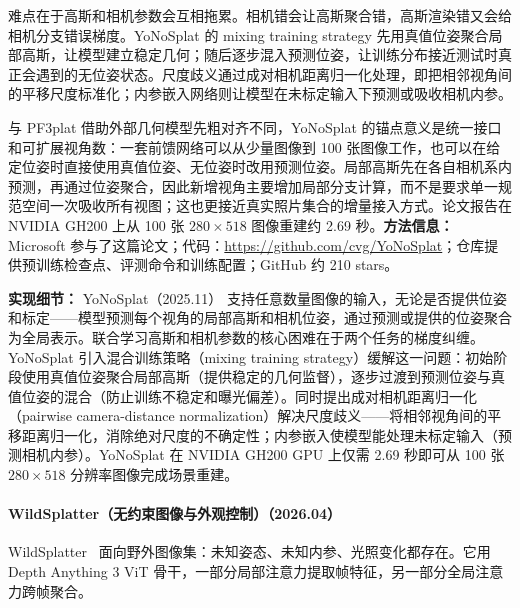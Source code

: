 难点在于高斯和相机参数会互相拖累。相机错会让高斯聚合错，高斯渲染错又会给相机分支错误梯度。YoNoSplat 的 mixing training strategy 先用真值位姿聚合局部高斯，让模型建立稳定几何；随后逐步混入预测位姿，让训练分布接近测试时真正会遇到的无位姿状态。尺度歧义通过成对相机距离归一化处理，即把相邻视角间的平移尺度标准化；内参嵌入网络则让模型在未标定输入下预测或吸收相机内参。

与 PF3plat 借助外部几何模型先粗对齐不同，YoNoSplat 的锚点意义是统一接口和可扩展视角数：一套前馈网络可以从少量图像到 100 张图像工作，也可以在给定位姿时直接使用真值位姿、无位姿时改用预测位姿。局部高斯先在各自相机系内预测，再通过位姿聚合，因此新增视角主要增加局部分支计算，而不是要求单一规范空间一次吸收所有视图；这也更接近真实照片集合的增量接入方式。论文报告在 NVIDIA GH200 上从 100 张 $280\times518$ 图像重建约 2.69 秒。\textbf{方法信息：} Microsoft 参与了这篇论文；代码：\url{https://github.com/cvg/YoNoSplat}；仓库提供预训练检查点、评测命令和训练配置；GitHub 约 210 stars。

\textbf{实现细节：} YoNoSplat（2025.11） 支持任意数量图像的输入，无论是否提供位姿和标定——模型预测每个视角的局部高斯和相机位姿，通过预测或提供的位姿聚合为全局表示。联合学习高斯和相机参数的核心困难在于两个任务的梯度纠缠。YoNoSplat 引入混合训练策略（mixing training strategy）缓解这一问题：初始阶段使用真值位姿聚合局部高斯（提供稳定的几何监督），逐步过渡到预测位姿与真值位姿的混合（防止训练不稳定和曝光偏差）。同时提出成对相机距离归一化（pairwise camera-distance normalization）解决尺度歧义——将相邻视角间的平移距离归一化，消除绝对尺度的不确定性；内参嵌入使模型能处理未标定输入（预测相机内参）。YoNoSplat 在 NVIDIA GH200 GPU 上仅需 2.69 秒即可从 100 张 $280 \times 518$ 分辨率图像完成场景重建。



\paragraph{WildSplatter（无约束图像与外观控制）（2026.04）}
WildSplatter~\cite{2604_21182} 面向野外图像集：未知姿态、未知内参、光照变化都存在。它用 Depth Anything 3 ViT 骨干，一部分局部注意力提取帧特征，另一部分全局注意力跨帧聚合。

